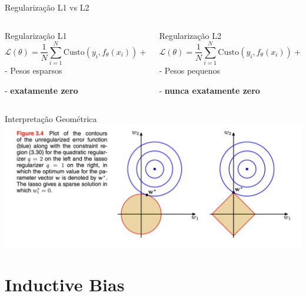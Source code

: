 \documentclass{beamer}
\begin{document}
\begin{frame}{Regularização L1 vs L2}
\begin{columns}[T]
\begin{column}{0.5\textwidth}
\begin{block}{Regularização L1}
\vspace{0.3cm}
{\tiny
$$\mathcal{L}(\theta) = \frac{1}{N}\sum_{i=1}^{N}\text{Custo}(y_i, f_\theta(x_i)) + \lambda||\theta||_1$$
}
\vspace{0.5cm}
- Pesos esparsos

- \textbf{exatamente zero}
\vspace{0.3cm}
\end{block}
\end{column}

\begin{column}{0.48\textwidth}
\begin{block}{Regularização L2}
\vspace{0.3cm}
{\tiny
$$\mathcal{L}(\theta) = \frac{1}{N}\sum_{i=1}^{N}\text{Custo}(y_i, f_\theta(x_i)) + \lambda||\theta||_2^2$$
}
\vspace{0.5cm}
- Pesos pequenos

- \textbf{nunca exatamente zero}
\vspace{0.3cm}
\end{block}
\end{column}
\end{columns}
\end{frame}


\begin{frame}{Interpretação Geométrica}
\centering
\includegraphics[width=\textwidth,height=0.8\textheight,keepaspectratio]{imgs/bishop_example/7.png}
\end{frame}

\section{Inductive Bias}
\end{document}
